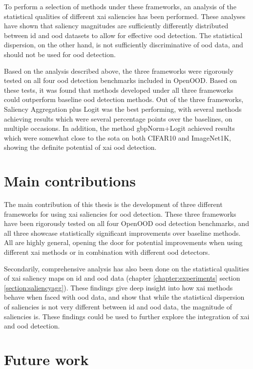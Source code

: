 \documentclass[UKenglish]{uiomasterthesis} %
\theoremstyle{definition}
\begin{document}
To perform a selection of methods under these frameworks, an analysis of the statistical qualities of different \ac{xai} saliencies has been performed. These analyses have shown that saliency magnitudes are sufficiently differently distributed between \ac{id} and \ac{ood} datasets to allow for effective \ac{ood} detection. The statistical dispersion, on the other hand, is not sufficiently discriminative of \ac{ood} data, and should not be used for \ac{ood} detection.

Based on the analysis described above, the three frameworks were rigorously tested on all four \ac{ood} detection benchmarks included in OpenOOD. Based on these tests, it was found that methods developed under all three frameworks could outperform baseline \ac{ood} detection methods. Out of the three frameworks, Saliency Aggregation plus Logit was the best performing, with several methods achieving results which were several percentage points over the baselines, on multiple occasions. In addition, the method \ac{gbp}Norm+Logit achieved results which were somewhat close to the \ac{sota} on both CIFAR10 and ImageNet1K, showing the definite potential of \ac{xai} \ac{ood} detection.

\section{Main contributions}

The main contribution of this thesis is the development of three different frameworks for using \ac{xai} saliencies for \ac{ood} detection. These three frameworks have been rigorously tested on all four OpenOOD \ac{ood} detection benchmarks, and all three showcase statistically significant improvements over baseline methods. All are highly general, opening the door for potential improvements when using different \ac{xai} methods or in combination with different \ac{ood} detectors.

Secondarily, comprehensive analysis has also been done on the statistical qualities of \ac{xai} saliency maps on \ac{id} and \ac{ood} data (chapter \ref{chapter:experiments} section \ref{section:saliencyagg}). These findings give deep insight into how \ac{xai} methods behave when faced with \ac{ood} data, and show that while the statistical dispersion of saliencies is not very different between \ac{id} and \ac{ood} data, the magnitude of saliencies is. These findings could be used to further explore the integration of \ac{xai} and \ac{ood} detection.


\section{Future work} \label{section:future}
\end{document}
